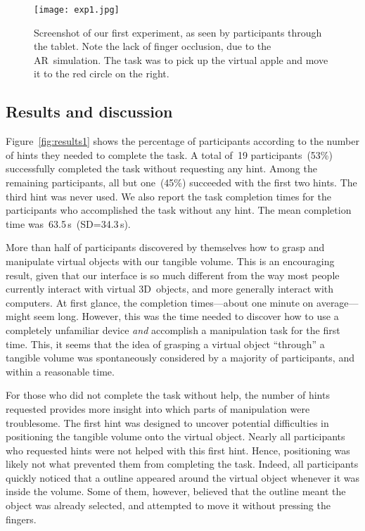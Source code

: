 \documentclass{vgtc}                         \havecopyrightspacefalse
\begin{document}
\begin{figure}[t]
  \centering
  \texttt{[image: exp1.jpg]}
  \caption{Screenshot of our first experiment, as seen by participants through the tablet. Note the lack of finger occlusion, due to the AR~simulation. The task was to pick up the virtual apple and move it to the red circle on the right.}
  \label{fig:results1-photo}
\end{figure}

\subsection{Results and discussion}

Figure~\ref{fig:results1} shows the percentage of participants according to the number of hints they needed to complete the task. A total of~19 participants~(53\%) successfully completed the task without requesting any hint. Among the remaining participants, all but one~(45\%) succeeded with the first two hints. The third hint was never used. We also report the task completion times for the participants who accomplished the task without any hint. The mean completion time was~63.5\,s~(SD=34.3\,s).

More than half of participants discovered by themselves how to grasp and manipulate virtual objects with our tangible volume. This is an encouraging result, given that our interface is so much different from the way most people currently interact with virtual 3D~objects, and more generally interact with computers. At first glance, the completion times---about one minute on average---might seem long. However, this was the time needed to discover how to use a completely unfamiliar device \emph{and} accomplish a manipulation task for the first time. This, it seems that the idea of grasping a virtual object ``through'' a tangible volume was spontaneously considered by a majority of participants, and within a reasonable time.

For those who did not complete the task without help, the number of hints requested provides more insight into which parts of manipulation were troublesome. The first hint was designed to uncover potential difficulties in positioning the tangible volume onto the virtual object. Nearly all participants who requested hints were not helped with this first hint. Hence, positioning was likely not what prevented them from completing the task. Indeed, all participants quickly noticed that a outline appeared around the virtual object whenever it was inside the volume. Some of them, however, believed that the outline meant the object was already selected, and attempted to move it without pressing the fingers.
\end{document}
